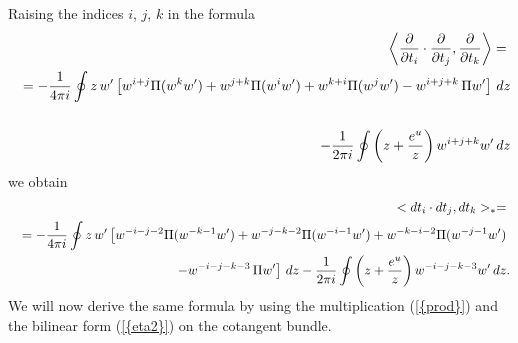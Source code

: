 \documentclass[numbook, envcountsame, envcountreset]{svjour3}
\begin{document}
{} Raising the indices $i$, $j$, $k$ in the formula
\begin{eqnarray}
&&
\left\langle \frac{\partial}{{\partial} t_i} \cdot \frac{\partial}{{\partial} t_j}, \frac{\partial}{{\partial} t_k}\right\rangle=
{\nonumber}\\
&&
=-\frac1{4\pi i} \oint z\,w'\left[ w^{i+j} \Pi(w^k w')
+w^{j+k} \Pi(w^i w') + w^{k+i} \Pi (w^j w')- w^{i+j+k}\,\Pi w' \right]\, dz
{\nonumber}\\
&&
{\nonumber}\\
&&
-\frac1{2\pi i} \oint \left( z+\frac{e^u}{z}\right) w^{i+j+k} w'\, dz
{\nonumber}
\end{eqnarray}
we obtain
\begin{eqnarray}
&&
< dt_i\cdot dt_j, dt_k >_* =
{\nonumber}\\
&&
=-\frac1{4\pi i} \oint z\,w'\left[ w^{-i-j-2} \Pi(w^{-k-1} w')
+w^{-j-k-2} \Pi(w^{-i-1} w') + w^{-k-i-2} \Pi (w^{-j-1} w')
\right.
{\nonumber}\\
&&\left.
- w^{-i-j-k-3}\,\Pi w' \right]\, dz
-\frac1{2\pi i} \oint \left( z+\frac{e^u}{z}\right) w^{-i-j-k-3} w'\, dz.
{\nonumber}
\end{eqnarray}
We will now derive the same formula by using the multiplication {(\ref{{prod}})} and the bilinear form {(\ref{{eta2}})} on the cotangent bundle.
\end{document}
